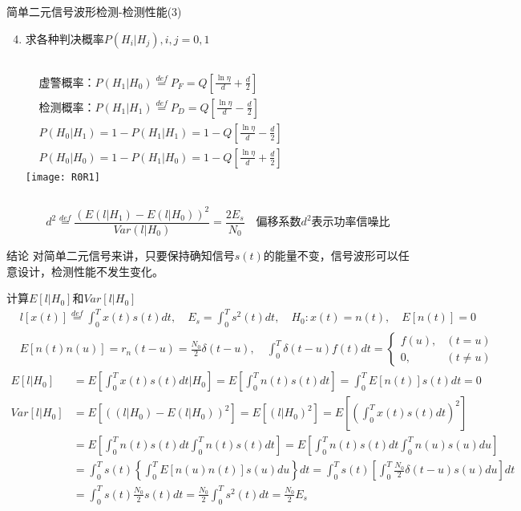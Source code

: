 \begin{frame}[shrink]{简单二元信号波形检测-检测性能(3)}
\begin{enumerate}
\setcounter{enumi}{3} 
\item 求各种判决概率$P(H_i|H_j),i,j=0,1$
\begin{columns}
\begin{align*}
&\text{虚警概率：} P(H_1|H_0)\mathop{=}\limits^{def}P_F=Q\left[\frac{\ln\eta}{d}+\frac{d}{2}\right]\\ 
&\text{检测概率：} P(H_1|H_1)\mathop{=}\limits^{def}P_D=Q\left[\frac{\ln\eta}{d}-\frac{d}{2}\right]\\
&P(H_0|H_1)=1-P(H_1|H_1)=1-Q\left[\frac{\ln\eta}{d}-\frac{d}{2}\right]\\
&P(H_0|H_0)=1-P(H_1|H_0)=1-Q\left[\frac{\ln\eta}{d}+\frac{d}{2}\right]
\end{align*}
\texttt{[image: R0R1]}
\end{columns}
\[d^2\mathop{=}\limits^{def}\frac{(E(l|H_1)-E(l|H_0))^2}{Var(l|H_0)}=\frac{2E_s}{N_0} \quad \text{偏移系数$d^2$表示功率信噪比}\]
\end{enumerate}
\begin{block}{结论}
对简单二元信号来讲，只要保持确知信号$s(t)$的能量不变，信号波形可以任意设计，检测性能不发生变化。
\end{block}
\end{frame}

\begin{frame}[shrink]{计算$E[l|H_0]$和$Var[l|H_0]$}
\begin{align*}
&l[x(t)]\mathop{=}\limits^{def}\int_{0}^{T}x(t)s(t)dt,\quad E_s=\int_{0}^{T}s^2(t)dt,\quad H_0:x(t)=n(t), \quad E[n(t)]=0\\
&E[n(t)n(u)]=r_n(t-u)=\frac{N_0}{2}\delta(t-u), \quad
\int_0^T\delta(t-u)f(t)dt=
\begin{cases}
f(u), & (t=u)\\
0, & (t\ne u) 
\end{cases}
\end{align*}
\begin{align*}
E[l|H_0]&=E\left[\int_{0}^{T}x(t)s(t)dt|H_0\right]=E\left[\int_{0}^{T}n(t)s(t)dt\right]=\int_{0}^{T}E[n(t)]s(t)dt=0\\
Var[l|H_0]&=E[((l|H_0)-E(l|H_0))^2]=E[(l|H_0)^2]=E\left[\left(\int_{0}^{T}x(t)s(t)dt\right)^2\right]\\
&=E\left[\int_{0}^{T}n(t)s(t)dt\int_{0}^{T}n(t)s(t)dt\right]=E\left[\int_{0}^{T}n(t)s(t)dt\int_{0}^{T}n(u)s(u)du\right]\\
&=\int_{0}^{T}s(t)\left\{\int_{0}^{T}E[n(u)n(t)]s(u)du\right\}dt=\int_{0}^{T}s(t)\left[\int_{0}^{T}\frac{N_0}{2}\delta(t-u)s(u)du\right]dt\\
&=\int_{0}^{T}s(t)\frac{N_0}{2}s(t)dt=\frac{N_0}{2}\int_{0}^{T}s^2(t)dt=\frac{N_0}{2}E_s
\end{align*}
\end{frame}

